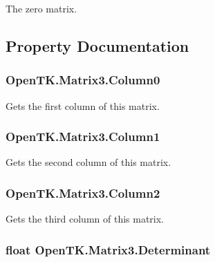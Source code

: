 The zero matrix. 



\subsection{Property Documentation}
\hypertarget{struct_open_t_k_1_1_matrix3_ad98e691ae5df22b80abada58460f4e5a}{
\subsubsection[{Column0}]{ Open\-T\-K.\-Matrix3.\-Column0\hspace{0.3cm}{\ttfamily [get]}}}\label{struct_open_t_k_1_1_matrix3_ad98e691ae5df22b80abada58460f4e5a}


Gets the first column of this matrix. 

\hypertarget{struct_open_t_k_1_1_matrix3_a8863bccfc81bce7def87f1b422b213c8}{
\subsubsection[{Column1}]{ Open\-T\-K.\-Matrix3.\-Column1\hspace{0.3cm}{\ttfamily [get]}}}\label{struct_open_t_k_1_1_matrix3_a8863bccfc81bce7def87f1b422b213c8}


Gets the second column of this matrix. 

\hypertarget{struct_open_t_k_1_1_matrix3_a2d6de46f12e7506d253cd60031d609fd}{
\subsubsection[{Column2}]{ Open\-T\-K.\-Matrix3.\-Column2\hspace{0.3cm}{\ttfamily [get]}}}\label{struct_open_t_k_1_1_matrix3_a2d6de46f12e7506d253cd60031d609fd}


Gets the third column of this matrix. 

\hypertarget{struct_open_t_k_1_1_matrix3_aeea92fa70019761049f0294d2c41eab5}{
\subsubsection[{Determinant}]{\setlength{\rightskip}{0pt plus 5cm}float Open\-T\-K.\-Matrix3.\-Determinant\hspace{0.3cm}{\ttfamily [get]}}}\label{struct_open_t_k_1_1_matrix3_aeea92fa70019761049f0294d2c41eab5}


